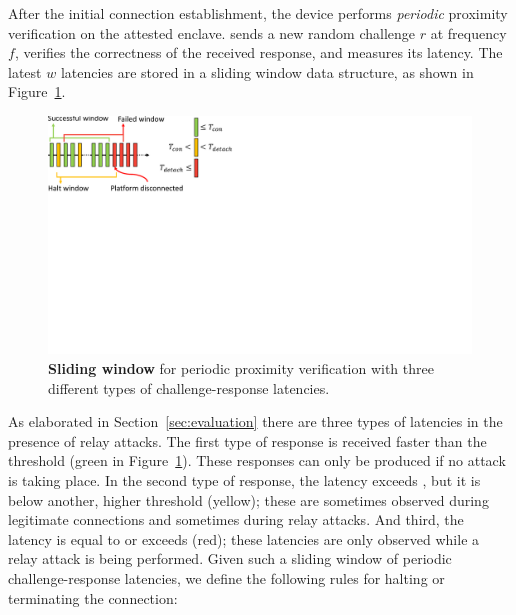
After the initial connection establishment, the \device device performs \emph{periodic} proximity verification on the attested enclave. \device sends a new random challenge $r$ at frequency $f$, verifies the correctness of the received response, and measures its latency. The latest $w$ latencies are stored in a sliding window data structure, as shown in Figure~\ref{fig:slidingWindow}.

\begin{figure}[t]
  \centering
   \includegraphics[trim={0 12.5cm 19cm 0}, clip, width=0.7\linewidth]{chapters/ProximiTEE/figures/SlidingWindow.pdf}
    \caption[\name periodic proximity verification]{\textbf{Sliding window} for periodic proximity verification with three different types of challenge-response latencies.}
    \label{fig:slidingWindow}
\end{figure}

As elaborated in Section~\ref{sec:evaluation} there are three types of latencies in the presence of relay attacks. The first type of response is received faster than the threshold \connect (green in Figure~\ref{fig:slidingWindow}). These responses can only be produced if no attack is taking place. In the second type of response, the latency exceeds \connect, but it is below another, higher threshold \detach (yellow); these are sometimes observed during legitimate connections and sometimes during relay attacks. And third, the latency is equal to or exceeds \detach (red); these latencies are only observed while a relay attack is being performed. Given such a sliding window of periodic challenge-response latencies, we define the following rules for halting or terminating the connection:

